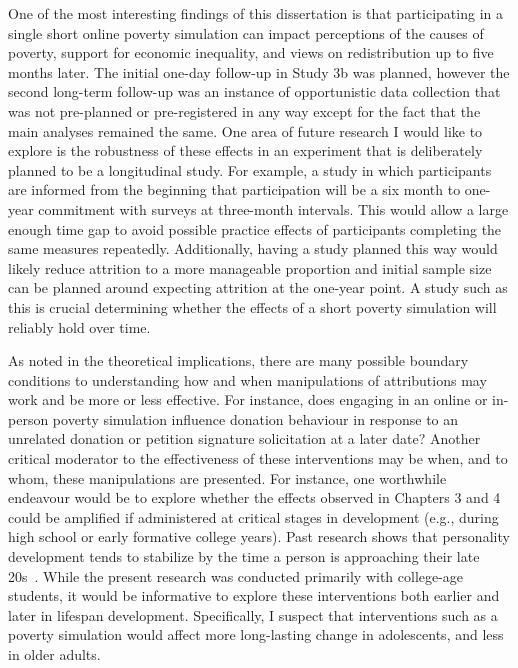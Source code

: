 \documentclass{sfuthesis}
\begin{document}
One of the most interesting findings of this dissertation is that participating in a single short online poverty simulation can impact perceptions of the causes of poverty, support for economic inequality, and views on redistribution up to five months later. The initial one-day follow-up in Study 3b was planned, however the second long-term follow-up was an instance of opportunistic data collection that was not pre-planned or pre-registered in any way except for the fact that the main analyses remained the same. One area of future research I would like to explore is the robustness of these effects in an experiment that is deliberately planned to be a longitudinal study. For example, a study in which participants are informed from the beginning that participation will be a six month to one-year commitment with surveys at three-month intervals. This would allow a large enough time gap to avoid possible practice effects of participants completing the same measures repeatedly. Additionally, having a study planned this way would likely reduce attrition to a more manageable proportion and initial sample size can be planned around expecting attrition at the one-year point. A study such as this is crucial determining whether the effects of a short poverty simulation will reliably hold over time.

As noted in the theoretical implications, there are many possible boundary conditions to understanding how and when manipulations of attributions may work and be more or less effective. For instance, does engaging in an online or in-person poverty simulation influence donation behaviour in response to an unrelated donation or petition signature solicitation at a later date? Another critical moderator to the effectiveness of these interventions may be when, and to whom, these manipulations are presented. For instance, one worthwhile endeavour would be to explore whether the effects observed in Chapters 3 and 4 could be amplified if administered at critical stages in development (e.g., during high school or early formative college years). Past research shows that personality development tends to stabilize by the time a person is approaching their late 20s~\cite{costa94, specht11}. While the present research was conducted primarily with college-age students, it would be informative to explore these interventions both earlier and later in lifespan development. Specifically, I suspect that interventions such as a poverty simulation would affect more long-lasting change in adolescents, and less in older adults.
\end{document}
